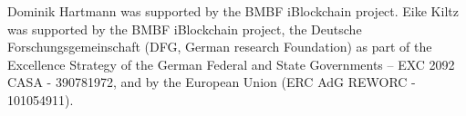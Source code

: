 \documentclass[sigconf]{acmart}
\begin{document}
\begin{acks}
Dominik Hartmann was supported by the BMBF iBlockchain project.
Eike Kiltz was supported by the BMBF iBlockchain project, the Deutsche Forschungsgemeinschaft (DFG, German research Foundation) as part of the Excellence Strategy of the German Federal and State Governments – EXC 2092 CASA - 390781972, and by the European Union (ERC AdG REWORC - 101054911).
\end{acks}


\balance

\end{document}
